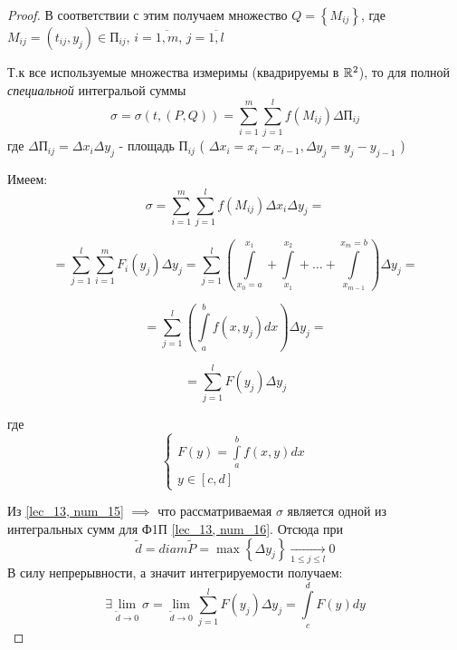 \documentclass[../../main.tex]{subfiles}
\begin{document}
\begin{proof}
 	В соответствии с этим получаем множество 
 	$ Q = \left\lbrace M_{ij} \right\rbrace $,
 	где $ M_{ij} = \left( t_{ij}, y_j \right) \in \text{П}_{ij} $, 
 	$ i = \overline{1, m} $, 
 	$ j = \overline{1, l} $
 	
 	Т.к все используемые множества измеримы (квадрируемы в $ \mathbb{R}^2 $), 
 	то для полной \emph{специальной} интегральой суммы
 	\begin{equation}
 	\label{lec_13, num_14}
 	\sigma = \sigma \left( t, \left( P, Q \right) \right) = 
 	\sum\limits_{i = 1}^m 
 	\sum\limits_{j = 1}^l f \left( M_{ij} \right) \Delta \text{П}_{ij}
 	\end{equation}
 	где $\Delta \text{П}_{ij} = \Delta x_i \Delta y_j$ - 
 	площадь $\text{П}_{ij}$ 
 	( $ \Delta x_i = x_i - x_{i-1}, \Delta y_j = y_j - y_{j - 1} $ )
 	
 	Имеем:
 	\[ \sigma = \sum\limits_{i = 1}^m 
 	\sum\limits_{j = 1}^l f \left( M_{ij} \right) \Delta x_i \Delta y_j = \]
 	
 	\[ = \sum\limits_{j = 1}^l 
 	\sum\limits_{i = 1}^m F_i \left( y_j \right) \Delta y_j = 
 	\sum\limits_{j = 1}^l \left( 
 	\int\limits_{x_0 = a}^{ x_1 } + \int\limits_{x_1}^{ x_2 } + \dots + 
 	\int\limits_{ x_{m-1} }^{x_m = b} \right) \Delta y_j = \]
 	
 	\[ = \sum\limits_{j = 1}^l \left( \int\limits_a^b f 
 	\left( x, y_j\right) dx \right) \Delta y_j =  \]
 	
 	\begin{equation}
 	\label{lec_13, num_15}
 	= \sum\limits_{j = 1}^l F \left( y_j \right) \Delta y_j 
 	\end{equation}
 	
 	где
 	\begin{equation}
 	\label{lec_13, num_16}
 	\begin{cases}
 	F \left( y \right) = \int\limits_a^b f \left( x, y \right) dx \\
 	y \in \left[ c, d \right] 
 	\end{cases}
 	\end{equation}
 	
 	Из \eqref{lec_13, num_15} $ \implies $ что рассматриваемая $\sigma$
 	является одной из интегральных сумм для Ф1П  \eqref{lec_13, num_16}.
 	Отсюда при 
 	\[ \widetilde{d} = diam \widetilde{P} = 
 	\max \left\lbrace \Delta y_j \right\rbrace 
 	\underset{1 \leq j \leq l}{\longrightarrow} 0 \]
 	В силу непрерывности, а значит интегрируемости получаем: 
 	\[ \exists \lim\limits_{ \widetilde{d} \to 0 } \sigma = 
 	\lim\limits_{ \widetilde{d} \to 0 } 
 	\sum\limits_{j = 1}^l F \left( y_j \right) \Delta y_j =
 	\int\limits_c^d F \left( y \right)dy  \]
 	

\end{proof}
\end{document}
